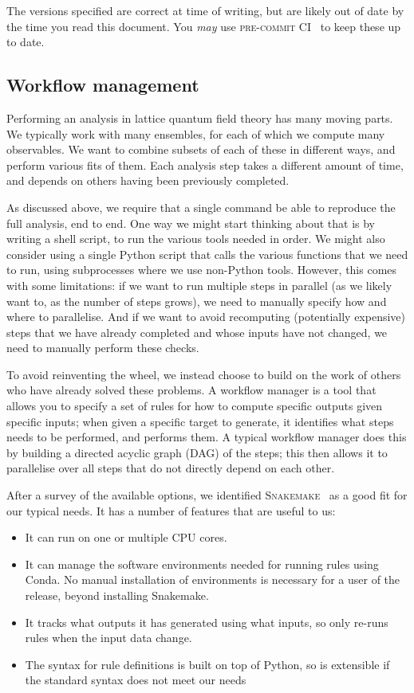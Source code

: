 \documentclass{article}
\newcommand\rfcword[1]{\emph{#1}\xspace}
\newcommand\may{\rfcword{may}}
\newcommand\program[1]{\textsc{#1}\xspace}
\begin{document}
The versions specified are correct at time of writing,
but are likely out of date by the time you read this document.
You \may use \program{pre-commit CI}~\cite{pre-commit-ci} to keep these up to date.

\subsection{Workflow management}\label{sec:wf-manager}

Performing an analysis in lattice quantum field theory has many moving parts.
We typically work with many ensembles,
for each of which we compute many observables.
We want to combine subsets of each of these in different ways,
and perform various fits of them.
Each analysis step takes a different amount of time,
and depends on others having been previously completed.

As discussed above,
we require that a single command be able to reproduce the full analysis,
end to end.
One way we might start thinking about that is by writing a shell script,
to run the various tools needed in order.
We might also consider using a single Python script
that calls the various functions that we need to run,
using subprocesses where we use non-Python tools.
However,
this comes with some limitations:
if we want to run multiple steps in parallel
(as we likely want to,
as the number of steps grows),
we need to manually specify how and where to parallelise.
And if we want to avoid recomputing
(potentially expensive)
steps that we have already completed
and whose inputs have not changed,
we need to manually perform these checks.

To avoid reinventing the wheel,
we instead choose to build on the work of others who have already solved these problems.
A workflow manager is a tool that allows you to specify
a set of rules for how to compute specific outputs given specific inputs;
when given a specific target to generate,
it identifies what steps needs to be performed,
and performs them.
A typical workflow manager does this
by building a directed acyclic graph
(DAG)
of the steps;
this then allows it to parallelise over all steps that do not directly depend on each other.

After a survey of the available options,
we identified \program{Snakemake}~\cite{molder2021sustainable} as a good fit for our typical needs.
It has a number of features that are useful to us:

\begin{itemize}
  \item
        It can run on one or multiple CPU cores.
  \item
        It can manage the software environments needed for running rules using Conda.
        No manual installation of environments is necessary for a user of the release,
        beyond installing Snakemake.
  \item
        It tracks what outputs it has generated using what inputs,
        so only re-runs rules when the input data change.
  \item
        The syntax for rule definitions is built on top of Python,
        so is extensible if the standard syntax does not meet our needs
\end{itemize}
\end{document}
